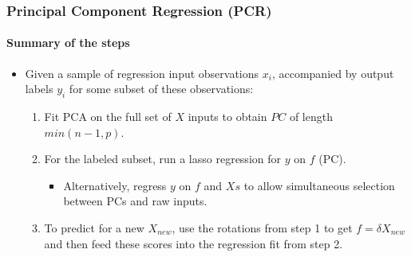 \documentclass[
  shownotes,
  xcolor={svgnames},
  hyperref={colorlinks,citecolor=DarkBlue,linkcolor=DarkRed,urlcolor=DarkBlue}
  , aspectratio=169]{beamer}
\begin{document}
\begin{frame}[fragile]
\frametitle{ Principal Component Regression (PCR)}
\framesubtitle{Summary of the steps}

\begin{itemize}

\item Given a sample of regression input observations $x_i$, accompanied by output labels $y_i$ for some subset of these observations: 
\medskip
\begin{enumerate}

  \item Fit PCA on the full set of $X$ inputs to obtain $PC$ of length $min(n-1, p)$. 
  \medskip
  \item For the labeled subset, run a lasso regression for $y$ on $f$ (PC).
  \medskip
    \begin{itemize}
      \item Alternatively, regress $y$ on $f$  and $Xs$ to allow simultaneous selection between PCs and raw inputs. 
      \medskip
    \end{itemize}
  \item To predict for a new $X_{new}$, use the rotations from step 1 to get $f = \delta X_{new}$ and then feed these scores into the regression fit from step 2. 
  \end{enumerate}

\end{itemize}



\end{frame}
\end{document}
